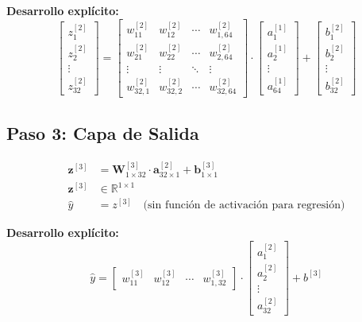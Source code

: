 \documentclass[12pt]{article}
\begin{document}
\textbf{Desarrollo explícito:}
\begin{equation}
\begin{bmatrix}
z^{[2]}_1 \\ z^{[2]}_2 \\ \vdots \\ z^{[2]}_{32}
\end{bmatrix}
=
\begin{bmatrix}
w^{[2]}_{11} & w^{[2]}_{12} & \cdots & w^{[2]}_{1,64} \\
w^{[2]}_{21} & w^{[2]}_{22} & \cdots & w^{[2]}_{2,64} \\
\vdots & \vdots & \ddots & \vdots \\
w^{[2]}_{32,1} & w^{[2]}_{32,2} & \cdots & w^{[2]}_{32,64}
\end{bmatrix}
\cdot
\begin{bmatrix}
a^{[1]}_1 \\ a^{[1]}_2 \\ \vdots \\ a^{[1]}_{64}
\end{bmatrix}
+
\begin{bmatrix}
b^{[2]}_1 \\ b^{[2]}_2 \\ \vdots \\ b^{[2]}_{32}
\end{bmatrix}
\end{equation}

\subsection{Paso 3: Capa de Salida}

\begin{align}
\mathbf{z}^{[3]} &= \mathbf{W}^{[3]}_{1 \times 32} \cdot \mathbf{a}^{[2]}_{32 \times 1} + \mathbf{b}^{[3]}_{1 \times 1} \\
\mathbf{z}^{[3]} &\in \mathbb{R}^{1 \times 1} \\
\hat{y} &= z^{[3]} \quad \text{(sin función de activación para regresión)}
\end{align}

\textbf{Desarrollo explícito:}
\begin{equation}
\hat{y} =
\begin{bmatrix}
w^{[3]}_{11} & w^{[3]}_{12} & \cdots & w^{[3]}_{1,32}
\end{bmatrix}
\cdot
\begin{bmatrix}
a^{[2]}_1 \\ a^{[2]}_2 \\ \vdots \\ a^{[2]}_{32}
\end{bmatrix}
+ b^{[3]}
\end{equation}
\end{document}
